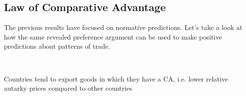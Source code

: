 \subsection{Law of Comparative Advantage}
The previous results have focused on normative predictions.
Let's take a look at how the same revealed preference argument can be used to make positive predictions about patterns of trade.

\begin{theorem}\label{thm:LCA}
    \

    Countries tend to export goods in which they have a CA, i.e. lower
relative autarky prices compared to other countries    
\end{theorem}